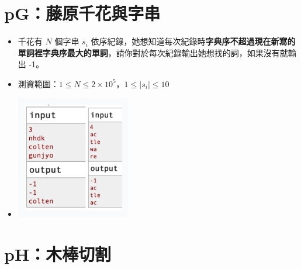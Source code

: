 \documentclass[12pt]{article}
\begin{document}
\section*{pG：藤原千花與字串}

\begin{itemize}[label={}, itemsep=0pt]
    \item 千花有 $N$ 個字串 $s_i$ 依序紀錄，她想知道每次紀錄時\textbf{字典序不超過現在新寫的單詞裡字典序最大的單詞}，請你對於每次紀錄輸出她想找的詞，如果沒有就輸出 -1。
    \item 測資範圍：$1 \leq N \leq 2 \times 10^5$，$1 \leq \mid s_i \mid \leq 10$
    \item \begin{center}\includegraphics[width=5.0cm]{img/pG}\end{center}
\end{itemize}

\section*{pH：木棒切割}
\end{document}
